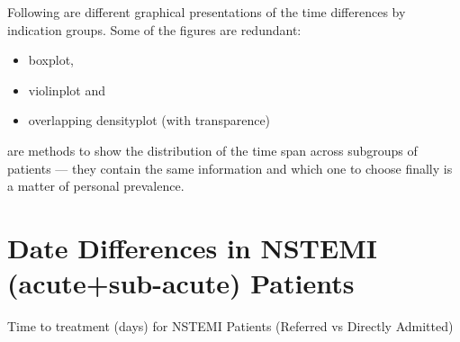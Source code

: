 \documentclass[presentation,xcolor=pdftex,dvipsnames,table,11pt]{beamer}
\begin{document}
\begin{tiny}
\begin{frame}
\end{frame}










\begin{frame}
Following are different graphical presentations of the time differences by indication groups. Some of the figures are redundant:
\begin{itemize}
  \item{boxplot,}
  \item{violinplot and}
  \item{overlapping densityplot (with transparence)}
\end{itemize}
are methods to show the distribution of the time span across subgroups of patients --- they contain the same information and which one to choose finally is a matter of personal prevalence.
\end{frame}




\section[Time-to-Treatment]{Date Differences in NSTEMI (acute+sub-acute) Patients}


\begin{frame}
  \begin{large}
  Time to treatment (days) for NSTEMI Patients (Referred vs Directly Admitted)
  \end{large}
\end{frame}



\end{tiny}
\end{document}
